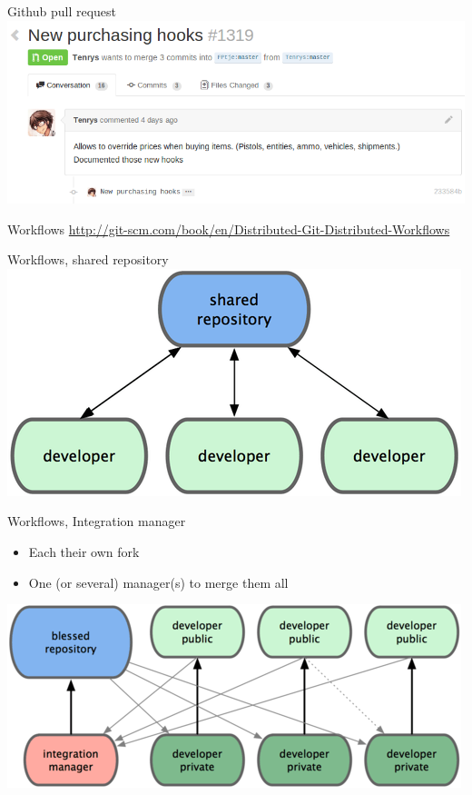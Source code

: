 \documentclass[10pt,a4paper]{beamer}
\begin{document}
\begin{frame}{Github pull request}
\includegraphics[width=\linewidth]{githubpull.png}
\end{frame}

\begin{frame}{Workflows}
\href{http://git-scm.com/book/en/Distributed-Git-Distributed-Workflows}{\color{blue}http://git-scm.com/book/en/Distributed-Git-Distributed-Workflows}
\end{frame}

\begin{frame}[plain]{Workflows, shared repository}
\includegraphics[width=\linewidth]{sharedrepo.png}
\end{frame}

\begin{frame}[plain]{Workflows, Integration manager}
\begin{itemize}
\item Each their own fork
\item One (or several) manager(s) to merge them all
\end{itemize}
\includegraphics[width=\linewidth]{integrationmanager.png}
\end{frame}
\end{document}
